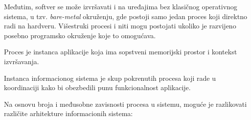 Međutim, softver se može izvršavati i na uređajima bez klasičnog operativnog sistema, u tzv. \textit{bare-metal} okruženju, gde postoji samo jedan proces koji direktno radi na hardveru. Višestruki procesi i niti mogu postojati ukoliko je razvijeno posebno programsko okruženje koje to omogućava.

\begin{definicija}
Proces je instanca aplikacije koja ima sopstveni memorijski prostor i kontekst izvršavanja.
\end{definicija}

\begin{definicija}
Instanca informacionog sistema je skup pokrenutih procesa koji rade u koordinaciji kako bi obezbedili punu funkcionalnost aplikacije.
\end{definicija}

Na osnovu broja i međusobne zavisnosti procesa u sistemu, moguće je razlikovati različite arhitekture informacionih sistema:

